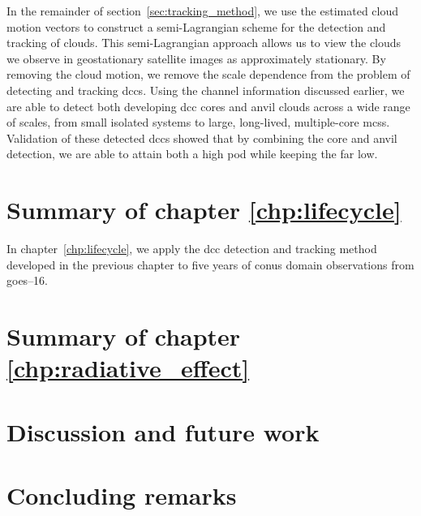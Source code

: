 In the remainder of section~\ref{sec:tracking_method}, we use the estimated cloud motion vectors to construct a semi-Lagrangian scheme for the detection and tracking of clouds.
This semi-Lagrangian approach allows us to view the clouds we observe in geostationary satellite images as approximately stationary.
By removing the cloud motion, we remove the scale dependence from the problem of detecting and tracking \acrshort{dcc}s.
Using the channel information discussed earlier, we are able to detect both developing \acrshort{dcc} cores and anvil clouds across a wide range of scales, from small isolated systems to large, long-lived, multiple-core \acrshort{mcs}s.
Validation of these detected \acrshort{dcc}s showed that by combining the core and anvil detection, we are able to attain both a high \acrshort{pod} while keeping the \acrshort{far} low.

\section{Summary of chapter \ref{chp:lifecycle}}

In chapter~\ref{chp:lifecycle}, we apply the \acrshort{dcc} detection and tracking method developed in the previous chapter to five years of \acrshort{conus} domain observations from \acrshort{goes}--16.





\section{Summary of chapter \ref{chp:radiative_effect}}




\section{Discussion and future work}




\section{Concluding remarks}